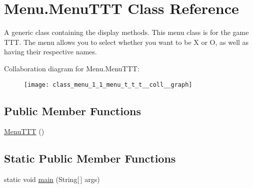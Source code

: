 \hypertarget{class_menu_1_1_menu_t_t_t}{}\section{Menu.\+Menu\+T\+T\+T Class Reference}
\label{class_menu_1_1_menu_t_t_t}


A generic class containing the display methods. This menu class is for the game T\+T\+T. The menu allows you to select whether you want to be X or O, as well as having their respective names.  




Collaboration diagram for Menu.\+Menu\+T\+T\+T\+:
\nopagebreak
\begin{figure}[H]
\begin{center}
\leavevmode
\texttt{[image: class\_menu\_1\_1\_menu\_t\_t\_t\_\_coll\_\_graph]}
\end{center}
\end{figure}
\subsection*{Public Member Functions}
\begin{DoxyCompactItemize}
\item 
\hyperlink{class_menu_1_1_menu_t_t_t_ad4e37e7c616519cc089666adf3bda2ad}{Menu\+T\+T\+T} ()
\end{DoxyCompactItemize}
\subsection*{Static Public Member Functions}
\begin{DoxyCompactItemize}
\item 
static void \hyperlink{class_menu_1_1_menu_t_t_t_aadb5ca51346ce541623408f04e806ba3}{main} (String\mbox{[}$\,$\mbox{]} args)
\end{DoxyCompactItemize}
